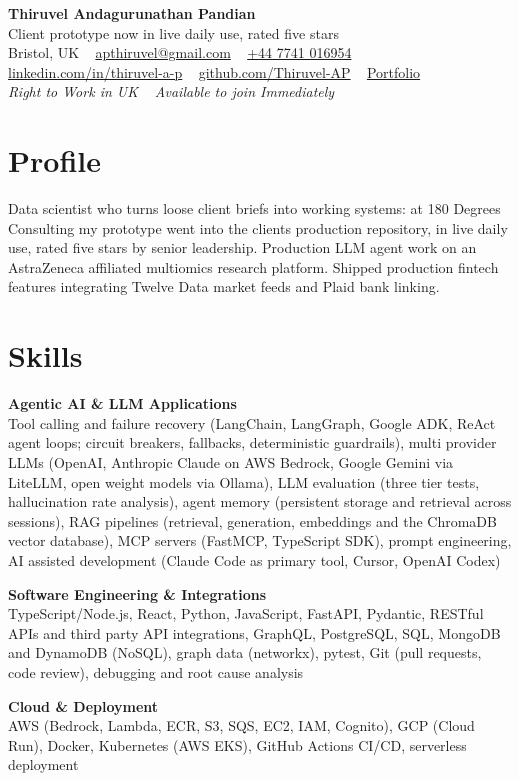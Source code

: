 \documentclass[a4paper,11pt]{article}
\newcommand{\skillgroup}[2]{{\color{navy}\textbf{#1}}\\ #2\par\vspace{3pt}}
\begin{document}
\begin{center}
  {\fontsize{22}{26}\selectfont\bfseries\color{navy} Thiruvel Andagurunathan Pandian}\\[4pt]
  {\fontsize{12}{14}\selectfont\color{navy} Client prototype now in live daily use, rated five stars}\\[4pt]
  {\small
  Bristol, UK\nobreak\ \,\textperiodcentered\, \href{mailto:apthiruvel@gmail.com}{apthiruvel@gmail.com}\nobreak\ \,\textperiodcentered\, \href{tel:+447741016954}{+44 7741 016954}\nobreak\ \,\textperiodcentered\, \href{https://www.linkedin.com/in/thiruvel-a-p/}{linkedin.com/in/thiruvel-a-p}\nobreak\ \,\textperiodcentered\, \href{https://github.com/Thiruvel-AP}{github.com/Thiruvel-AP}\nobreak\ \,\textperiodcentered\, \href{https://thiruvel-ap.github.io/PersonalPortfolio/}{Portfolio}}\\[3pt]
  {\small\itshape\color{muted} Right to Work in UK\nobreak\ \,\textperiodcentered\, Available to join Immediately}

\end{center}

\section{Profile}
Data scientist who turns loose client briefs into working systems: at 180 Degrees Consulting my prototype went into the client\textquotesingle{}s production repository, in live daily use, rated five stars by senior leadership. Production LLM agent work on an AstraZeneca affiliated multiomics research platform. Shipped production fintech features integrating Twelve Data market feeds and Plaid bank linking.

\section{Skills}
\skillgroup{Agentic AI \& LLM Applications}{Tool calling and failure recovery (LangChain, LangGraph, Google ADK, ReAct agent loops; circuit breakers, fallbacks, deterministic guardrails), multi provider LLMs (OpenAI, Anthropic Claude on AWS Bedrock, Google Gemini via LiteLLM, open weight models via Ollama), LLM evaluation (three tier tests, hallucination rate analysis), agent memory (persistent storage and retrieval across sessions), RAG pipelines (retrieval, generation, embeddings and the ChromaDB vector database), MCP servers (FastMCP, TypeScript SDK), prompt engineering, AI assisted development (Claude Code as primary tool, Cursor, OpenAI Codex)}
\skillgroup{Software Engineering \& Integrations}{TypeScript/Node.js, React, Python, JavaScript, FastAPI, Pydantic, RESTful APIs and third party API integrations, GraphQL, PostgreSQL, SQL, MongoDB and DynamoDB (NoSQL), graph data (networkx), pytest, Git (pull requests, code review), debugging and root cause analysis}
\skillgroup{Cloud \& Deployment}{AWS (Bedrock, Lambda, ECR, S3, SQS, EC2, IAM, Cognito), GCP (Cloud Run), Docker, Kubernetes (AWS EKS), GitHub Actions CI/CD, serverless deployment}
\end{document}
